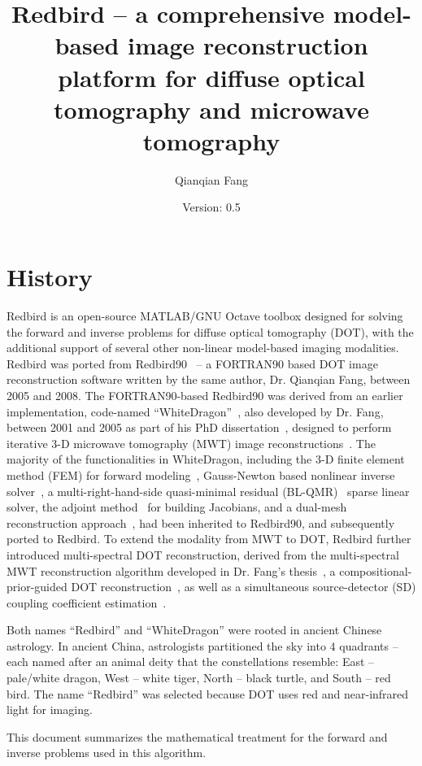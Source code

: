 \documentclass[12pt]{book}               %
\title{Redbird -- a comprehensive model-based image reconstruction platform for diffuse optical tomography and microwave tomography}
\author{Qianqian Fang}
\date{Version: 0.5}
\begin{document}
\maketitle              %

\chapter{History}

Redbird is an open-source MATLAB/GNU Octave toolbox designed for solving the forward and inverse
problems for diffuse optical tomography (DOT), with the additional support of 
several other non-linear model-based imaging modalities. Redbird was ported from 
Redbird90~\cite{Fang2008} -- a FORTRAN90 based DOT image reconstruction software written by the same author, Dr. Qianqian Fang, between 2005 and 2008. The FORTRAN90-based Redbird90 was derived from an earlier implementation, code-named ``WhiteDragon''~\cite{Fang2004, Fang2009IEEE}, also developed by Dr. Fang, between 2001 and 2005 as part of his PhD dissertation~\cite{Fang2004thesis}, designed to perform iterative 3-D microwave tomography (MWT) image reconstructions~\cite{FangThesis}. The majority of the functionalities in WhiteDragon, including the 3-D finite element method (FEM) for forward modeling~\cite{Fang2004}, Gauss-Newton based nonlinear inverse solver~\cite{Fang2009IEEE}, a multi-right-hand-side quasi-minimal residual (BL-QMR)~\cite{Boyse1996} sparse linear solver, the adjoint method~\cite{Fang2004} for building Jacobians, and a dual-mesh reconstruction approach~\cite{Paulsen1995}, had been inherited to Redbird90, and subsequently ported to Redbird. To extend the modality from MWT to DOT, Redbird further introduced multi-spectral DOT reconstruction, derived from the multi-spectral MWT reconstruction algorithm developed in Dr. Fang's thesis~\cite{FangThesis}, a compositional-prior-guided DOT reconstruction~\cite{Fang2010,Deng2015a}, as well as a simultaneous source-detector (SD) coupling coefficient estimation~\cite{Boas2001,Schweiger2007}. 

Both names ``Redbird'' and ``WhiteDragon'' were rooted in ancient Chinese astrology. In ancient China, astrologists partitioned the sky into 4 quadrants -- each named after an animal deity that the constellations resemble: East -- pale/white dragon, West -- white tiger, North -- black turtle, and South -- red bird. The name ``Redbird'' was selected because DOT uses red and near-infrared light for imaging.

This document summarizes the mathematical treatment for the forward 
and inverse problems used in this algorithm.
\end{document}
